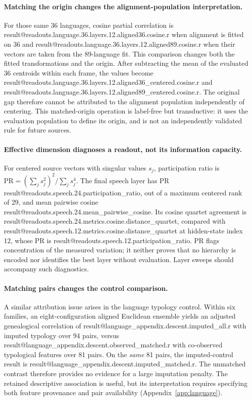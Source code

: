 \documentclass[mlmain]{jmlr}
\makeatletter
\newcommand{\Result}[1]{\csname result@#1\endcsname}
\makeatother
\begin{document}
\paragraph{Matching the origin changes the alignment-population interpretation.}
For those same 36 languages, cosine partial correlation is
\Result{readouts.language.36.layers.12.aligned36.cosine.r} when alignment is fitted on 36 and
\Result{readouts.language.36.layers.12.aligned89.cosine.r} when their vectors are taken from the
89-language fit. This comparison changes both the fitted transformations and the origin.
After subtracting the mean of the evaluated 36 centroids within each frame, the values become
\Result{readouts.language.36.layers.12.aligned36_centered.cosine.r} and
\Result{readouts.language.36.layers.12.aligned89_centered.cosine.r}.
The original gap therefore cannot be attributed to the alignment population independently of
centering. This matched-origin operation is label-free but transductive: it uses the evaluation
population to define its origin, and is not an independently validated rule for future sources.

\paragraph{Effective dimension diagnoses a readout, not its information capacity.}
For centered source vectors with singular values $s_j$, participation ratio is
$\mathrm{PR}=(\sum_j s_j^2)^2/\sum_j s_j^4$.
The final speech layer has PR \Result{readouts.speech.24.participation_ratio}, out of a maximum
centered rank of 29, and mean pairwise cosine
\Result{readouts.speech.24.mean_pairwise_cosine}. Its cosine quartet agreement is
\Result{readouts.speech.24.metrics.cosine.distance_quartet}, compared with
\Result{readouts.speech.12.metrics.cosine.distance_quartet} at hidden-state index 12, whose PR is
\Result{readouts.speech.12.participation_ratio}. PR flags concentration of the measured variation;
it neither proves that no hierarchy is encoded nor identifies the best layer without evaluation.
Layer sweeps should accompany such diagnostics.

\paragraph{Matching pairs changes the control comparison.}
A similar attribution issue arises in the language typology control. Within six families, an
eight-configuration aligned Euclidean ensemble yields an adjusted genealogical correlation of
\Result{language_appendix.descent.imputed_all.r} with imputed typology over 94 pairs, versus
\Result{language_appendix.descent.observed_matched.r} with co-observed typological features over
81 pairs. On the \emph{same} 81 pairs, the imputed-control result is
\Result{language_appendix.descent.imputed_matched.r}.
The unmatched contrast therefore provides no evidence for a large imputation penalty. The retained
descriptive association is useful, but its interpretation requires specifying both feature
provenance and pair availability (Appendix~\ref{app:language}).
\end{document}
